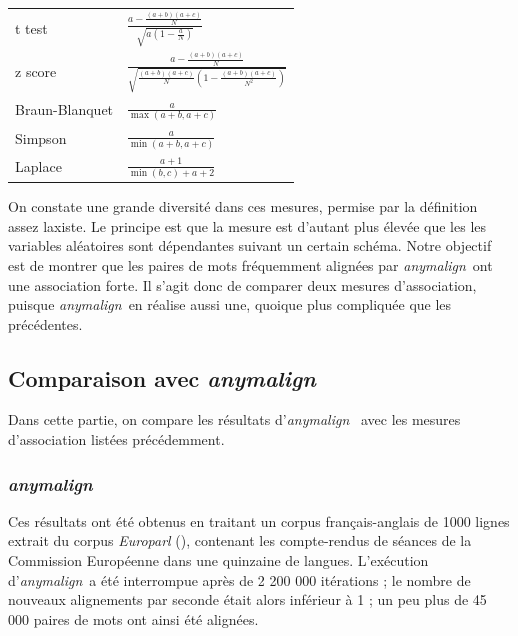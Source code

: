 \documentclass[a4paper,10pt]{article}
\newcommand{\anym}{\emph{anymalign}}
\begin{document}
\begin{tabular}{|l|l|}
t test & $\frac{a-\frac{(a+b)(a+c)}{N}}{\sqrt{a(1-\frac{a}{N})}}$ \\

z score & $\frac{a-\frac{(a+b)(a+c)}{N}}{\sqrt{\frac{(a+b)(a+c)}{N}(1-\frac{(a+b)(a+c)}{N^2})}}$ \\

Braun-Blanquet & $\frac{a}{\max(a+b,a+c)}$ \\

Simpson & $\frac{a}{\min(a+b,a+c)}$ \\

Laplace & $\frac{a+1}{\min(b,c)+a+2}$ \\

\hline
\end{tabular}

On constate une grande diversité dans ces mesures, permise par la définition assez laxiste. Le principe est que la mesure est d'autant plus élevée que les les variables aléatoires sont dépendantes suivant un certain schéma. Notre objectif est de montrer que les paires de mots fréquemment alignées par \anym~ont une association forte. Il s'agit donc de comparer deux mesures d'association, puisque \anym~en réalise aussi une, quoique plus compliquée que les précédentes.


\subsection{Comparaison avec \anym}

Dans cette partie, on compare les résultats d'\anym~ avec les mesures d'association listées précédemment.

\subsubsection{\anym}

Ces résultats ont été obtenus en traitant un corpus français-anglais de 1000 lignes extrait du corpus \emph{Europarl} (\cite{koehn2005europarl}), contenant les compte-rendus de séances de la Commission Européenne dans une quinzaine de langues. L'exécution d'\anym~a été interrompue après de 2 200 000 itérations ; le nombre de nouveaux alignements par seconde était alors inférieur à 1 ; un peu plus de 45 000 paires de mots ont ainsi été alignées.
\end{document}
